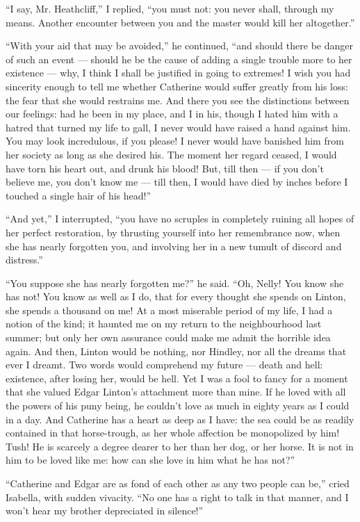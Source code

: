 \par “I say, Mr. Heathcliff,” I replied, “you must not: you never shall, through my means. Another encounter between you and the master would kill her altogether.”
\par “With your aid that may be avoided,” he continued, “and should there be danger of such an event — should he be the cause of adding a single trouble more to her existence — why, I think I shall be justified in going to extremes! I wish you had sincerity enough to tell me whether Catherine would suffer greatly from his loss: the fear that she would restrains me. And there you see the distinctions between our feelings: had he been in my place, and I in his, though I hated him with a hatred that turned my life to gall, I never would have raised a hand against him. You may look incredulous, if you please! I never would have banished him from her society as long as she desired his. The moment her regard ceased, I would have torn his heart out, and drunk his blood! But, till then — if you don't believe me, you don't know me — till then, I would have died by inches before I touched a single hair of his head!”
\par “And yet,” I interrupted, “you have no scruples in completely ruining all hopes of her perfect restoration, by thrusting yourself into her remembrance now, when she has nearly forgotten you, and involving her in a new tumult of discord and distress.”
\par “You suppose she has nearly forgotten me?” he said. “Oh, Nelly! You know she has not! You know as well as I do, that for every thought she spends on Linton, she spends a thousand on me! At a most miserable period of my life, I had a notion of the kind; it haunted me on my return to the neighbourhood last summer; but only her own assurance could make me admit the horrible idea again. And then, Linton would be nothing, nor Hindley, nor all the dreams that ever I dreamt. Two words would comprehend my future — death and hell: existence, after losing her, would be hell. Yet I was a fool to fancy for a moment that she valued Edgar Linton's attachment more than mine. If he loved with all the powers of his puny being, he couldn't love as much in eighty years as I could in a day. And Catherine has a heart as deep as I have: the sea could be as readily contained in that horse-trough, as her whole affection be monopolized by him! Tush! He is scarcely a degree dearer to her than her dog, or her horse. It is not in him to be loved like me: how can she love in him what he has not?”
\par “Catherine and Edgar are as fond of each other as any two people can be,” cried Isabella, with sudden vivacity. “No one has a right to talk in that manner, and I won't hear my brother depreciated in silence!”
